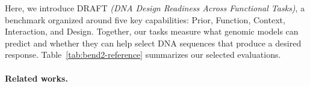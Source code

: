Here, we introduce DRAFT \textsl{(DNA Design Readiness Across Functional Tasks)}, a benchmark organized around five key capabilities: %
\textcolor{capSequencePriors}{Prior},
\textcolor{capFunctionalPrediction}{Function},
\textcolor{capBiologicalContext}{Context},
\textcolor{capGeneticInteractions}{Interaction}, and
\textcolor{capGenomicDesign}{Design}.
Together, our tasks measure what genomic models can predict and whether they can help select DNA sequences that produce a desired response. Table~\ref{tab:bend2-reference} summarizes our selected evaluations.



\paragraph{Related works.}


